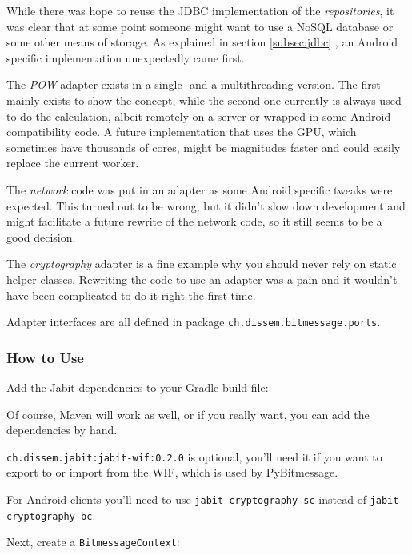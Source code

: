 \documentclass{bfh}
\begin{document}
  While there was hope to reuse the \acs{JDBC} implementation of the \textit{repositories}, it was clear that at some point someone might want to use a \acs{NoSQL} database or some other means of storage. As explained in section \ref{subsec:jdbc} , an Android specific implementation unexpectedly came first.

  The \textit{\acl{POW}} adapter exists in a single- and a multithreading version. The first mainly exists to show the concept, while the second one currently is always used to do the calculation, albeit remotely on a server or wrapped in some Android compatibility code. A future implementation that uses the \acs{GPU}, which sometimes have thousands of cores, might be magnitudes faster and could easily replace the current worker.

  The \textit{network} code was put in an adapter as some Android specific tweaks were expected. This turned out to be wrong, but it didn't slow down development and might facilitate a future rewrite of the network code, so it still seems to be a good decision.

  The \textit{cryptography} adapter is a fine example why you should never rely on static helper classes. Rewriting the code to use an adapter was a pain and it wouldn't have been complicated to do it right the first time.

  Adapter interfaces are all defined in package \texttt{ch.dissem.bitmessage.ports}.


  \subsubsection{How to Use}

  Add the Jabit dependencies to your Gradle build file:


  Of course, Maven will work as well, or if you really want, you can add the dependencies by hand.

  \texttt{ch.dissem.jabit:jabit-wif:0.2.0} is optional, you'll need it if you want to export to or import from the \acf{WIF}, which is used by PyBitmessage.

For Android clients you'll need to use \texttt{jabit-cryptography-sc} instead of \texttt{jabit-cryptography-bc}.

  Next, create a \texttt{BitmessageContext}:

\end{document}

